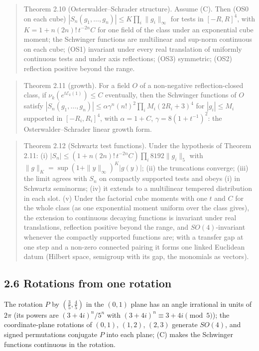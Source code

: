 \documentclass[10pt,letterpaper,twocolumn]{article}
\begin{document}
\begin{quote}
Theorem 2.10 (Osterwalder--Schrader structure). Assume (C). Then (OS0 on each cube) \(|S_n(g_1,\dots,g_n)|\le K\prod_i\|g_i\|_\infty\) for tests in \([-R,R]^4\), with \(K=1+n(2n)!\,t^{-2n}C\) for one field of the class under an exponential cube moment; the Schwinger functions are multilinear and sup-norm continuous on each cube; (OS1) invariant under every real translation of uniformly continuous tests and under axis reflections; (OS3) symmetric; (OS2) reflection positive beyond the range.
\end{quote}

\begin{quote}
Theorem 2.11 (growth). For a field \(O\) of a non-negative reflection-closed class, if \(\nu_k(e^{t\mathcal E_k(1)})\le C\) eventually, then the Schwinger functions of \(O\) satisfy \(|S_n(g_1,\dots,g_n)|\le\alpha\gamma^n(n!)^2\prod_iM_i(2R_i+3)^4\) for \(|g_i|\le M_i\) supported in \([-R_i,R_i]^4\), with \(\alpha=1+C\), \(\gamma=8(1+t^{-1})^2\): the Osterwalder--Schrader linear growth form.
\end{quote}

\begin{quote}
Theorem 2.12 (Schwartz test functions). Under the hypothesis of Theorem 2.11: (i) \(|S_n|\le(1+n(2n)!\,t^{-2n}C)\prod_i8192\|g_i\|_5\) with \(\|g\|_K=\sup(1+\|y\|_\infty)^K|g(y)|\); (ii) the truncations converge; (iii) the limit agrees with \(S_n\) on compactly supported tests and obeys (i) in Schwartz seminorms; (iv) it extends to a multilinear tempered distribution in each slot. (v) Under the factorial cube moments with one \(t\) and \(C\) for the whole class (as one exponential moment uniform over the class gives), the extension to continuous decaying functions is invariant under real translations, reflection positive beyond the range, and \(SO(4)\)-invariant whenever the compactly supported functions are; with a transfer gap at one step and a non-zero connected pairing it forms one linked Euclidean datum (Hilbert space, semigroup with its gap, the monomials as vectors).
\end{quote}

\subsection{2.6 Rotations from one rotation}\label{26-rotations-from-one-rotation}

The rotation \(P\) by \((\tfrac35,\tfrac45)\) in the \((0,1)\) plane has an angle irrational in units of \(2\pi\) (its powers are \((3+4i)^n/5^n\) with \((3+4i)^n\equiv3+4i\pmod5\)); the coordinate-plane rotations of \((0,1)\), \((1,2)\), \((2,3)\) generate \(SO(4)\), and signed permutations conjugate \(P\) into each plane; (C) makes the Schwinger functions continuous in the rotation.
\end{document}
